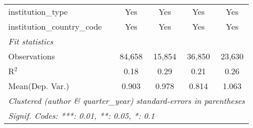 \begin{tabular}{lcccc}
   institution\_type            & Yes           & Yes           & Yes           & Yes\\  
   institution\_country\_code   & Yes           & Yes           & Yes           & Yes\\  
   \midrule
   \emph{Fit statistics}\\
   Observations                 & 84,658        & 15,854        & 36,850        & 23,630\\  
   R$^2$                        & 0.18          & 0.29          & 0.21          & 0.26\\  
Mean(Dep. Var.) & 0.903 & 0.978 & 0.814 & 1.063 \\
   \midrule \midrule
   \multicolumn{5}{l}{\emph{Clustered (author \& quarter\_year) standard-errors in parentheses}}\\
   \multicolumn{5}{l}{\emph{Signif. Codes: ***: 0.01, **: 0.05, *: 0.1}}\\
\end{tabular}
\par\endgroup
